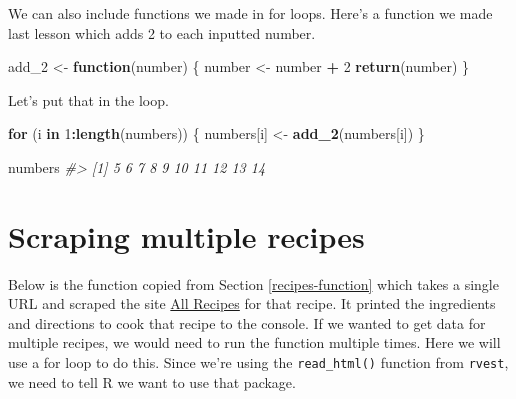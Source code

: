 \documentclass[
  12pt,
]{book}
\newenvironment{Shaded}{\begin{snugshade}}{\end{snugshade}}
\newcommand{\CommentTok}[1]{\textcolor[rgb]{0.37,0.37,0.37}{\textit{#1}}}
\newcommand{\ControlFlowTok}[1]{\textcolor[rgb]{0.27,0.27,0.27}{\textbf{#1}}}
\newcommand{\DecValTok}[1]{\textcolor[rgb]{0.06,0.06,0.06}{#1}}
\newcommand{\KeywordTok}[1]{\textcolor[rgb]{0.27,0.27,0.27}{\textbf{#1}}}
\newcommand{\NormalTok}[1]{#1}
\newcommand{\OperatorTok}[1]{\textcolor[rgb]{0.43,0.43,0.43}{\textbf{#1}}}
\newcommand{\StringTok}[1]{\textcolor[rgb]{0.5,0.5,0.5}{#1}}
\begin{document}
We can also include functions we made in for loops. Here's a function we made last lesson which adds 2 to each inputted number.

\begin{Shaded}
\begin{Highlighting}[]
\NormalTok{add\_}\DecValTok{2}\NormalTok{ \textless{}{-}}\StringTok{ }\ControlFlowTok{function}\NormalTok{(number) \{}
\NormalTok{  number \textless{}{-}}\StringTok{ }\NormalTok{number }\OperatorTok{+}\StringTok{ }\DecValTok{2}
  \KeywordTok{return}\NormalTok{(number)}
\NormalTok{\}}
\end{Highlighting}
\end{Shaded}

Let's put that in the loop.

\begin{Shaded}
\begin{Highlighting}[]
\ControlFlowTok{for}\NormalTok{ (i }\ControlFlowTok{in} \DecValTok{1}\OperatorTok{:}\KeywordTok{length}\NormalTok{(numbers)) \{}
\NormalTok{  numbers[i] \textless{}{-}}\StringTok{ }\KeywordTok{add\_2}\NormalTok{(numbers[i])}
\NormalTok{\}}
\end{Highlighting}
\end{Shaded}

\begin{Shaded}
\begin{Highlighting}[]
\NormalTok{numbers}
\CommentTok{\#\textgreater{}  [1]  5  6  7  8  9 10 11 12 13 14}
\end{Highlighting}
\end{Shaded}

\hypertarget{scraping-multiple-recipes}{%
\section{Scraping multiple recipes}\label{scraping-multiple-recipes}}

Below is the function copied from Section \ref{recipes-function} which takes a single URL and scraped the site \href{https://www.allrecipes.com/}{All Recipes} for that recipe. It printed the ingredients and directions to cook that recipe to the console. If we wanted to get data for multiple recipes, we would need to run the function multiple times. Here we will use a for loop to do this. Since we're using the \texttt{read\_html()} function from \texttt{rvest}, we need to tell R we want to use that package.
\end{document}
